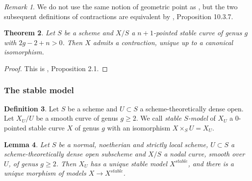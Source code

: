 \documentclass[a4paper,12pt]{amsart} %
\numberwithin{equation}{subsection}
\theoremstyle{definition}
\newtheorem{definition}{Definition}[section]
\theoremstyle{plain}%
\newtheorem{lemma}[definition]{Lemma}
\newtheorem{theorem}[definition]{Theorem}
\theoremstyle{remark}
\newtheorem{remark}[definition]{Remark}
\begin{document}
\begin{remark}
We do not use the same notion of geometric point as \cite{Knudsen}, but the two subsequent definitions of contractions are equivalent by \cite{Liu}, Proposition 10.3.7.
\end{remark}

\begin{theorem}\label{Theorem existence of contractions}
Let $S$ be a scheme and $X/S$ a $n+1$-pointed stable curve of genus $g$ with $2g-2+n>0$. Then $X$ admits a contraction, unique up to a canonical isomorphism.
\end{theorem}

\begin{proof}
This is \cite{Knudsen}, Proposition 2.1.
\end{proof}

\subsubsection{The stable model}

\begin{definition}\label{definition stable model}
Let $S$ be a scheme and $U\subset S$ a scheme-theoretically dense open. Let $X_U/U$ be a smooth curve of genus $g\geq 2$. We call \emph{stable $S$-model} of $X_U$ a $0$-pointed stable curve $X$ of genus $g$ with an isomorphism $X\times_S U=X_U$.
\end{definition}


\begin{lemma}\label{existence des modeles stables localement sur S}
Let $S$ be a normal, noetherian and strictly local scheme, $U\subset S$ a scheme-theoretically dense open subscheme and $X/S$ a nodal curve, smooth over $U$, of genus $g\geq 2$. Then $X_U$ has a unique stable model $X^{stable}$, and there is a unique morphism of models $X\to X^{stable}$.
\end{lemma}
\end{document}
